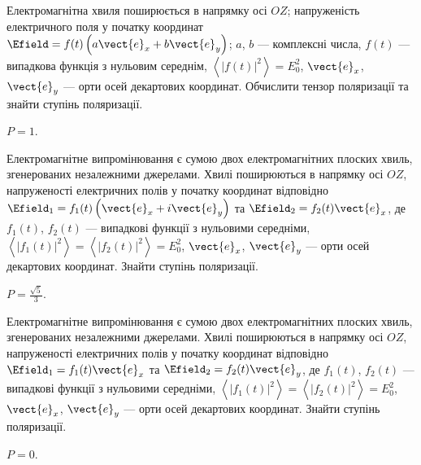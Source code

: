 \begin{problem}%
    Електромагнітна хвиля поширюється в напрямку осі $OZ$; напруженість  електричного поля у початку координат  $\Efield = f(t)\left(a\vect{e}_x +
    b\vect{e}_y \right) $;  $a$, $b$ --- комплексні числа,  $f(t)$ --- випадкова функція з нульовим середнім,  $\left\langle |f(t)|^2\right\rangle =
    E_0^2$,  $\vect{e}_x$, $\vect{e}_y$ --- орти осей декартових координат. Обчислити тензор поляризації та знайти ступінь поляризації.
\begin{solution}
$P = 1$.
\end{solution}
\end{problem}


\begin{problem}%
Електромагнітне випромінювання є сумою двох електромагнітних  плоских хвиль, згенерованих незалежними джерелами. Хвилі поширюються в напрямку осі $OZ$,
напруженості електричних полів у початку координат відповідно $\Efield_1 = f_1(t)\left(\vect{e}_x + i
    \vect{e}_y \right) $  та $\Efield_2 = f_2(t) \vect{e}_x $, де  $f_1(t)$, $f_2(t)$  --- випадкові функції з нульовими середніми,  $\left\langle
    |f_1(t)|^2\right\rangle = \left\langle |f_2(t)|^2\right\rangle =
    E_0^2$, $\vect{e}_x$, $\vect{e}_y$ --- орти осей декартових координат. Знайти ступінь поляризації.
\begin{solution}
$P = \frac{\sqrt{5}}3$.
\end{solution}
\end{problem}


\begin{problem}%
   Електромагнітне випромінювання є сумою двох електромагнітних плоских хвиль, згенерованих незалежними джерелами. Хвилі поширюються в напрямку осі
   $OZ$,
   напруженості електричних полів у початку координат відповідно $\Efield_1 = f_1(t)\vect{e}_x $  та $\Efield_2 = f_2(t) \vect{e}_y $, де  $f_1(t)$,
   $f_2(t)$  --- випадкові функції з нульовими середніми,  $\left\langle
    |f_1(t)|^2\right\rangle = \left\langle |f_2(t)|^2\right\rangle =
    E_0^2$, $\vect{e}_x$, $\vect{e}_y$ --- орти осей декартових координат. Знайти ступінь поляризації.
\begin{solution}
$P = 0$.
\end{solution}
\end{problem}

